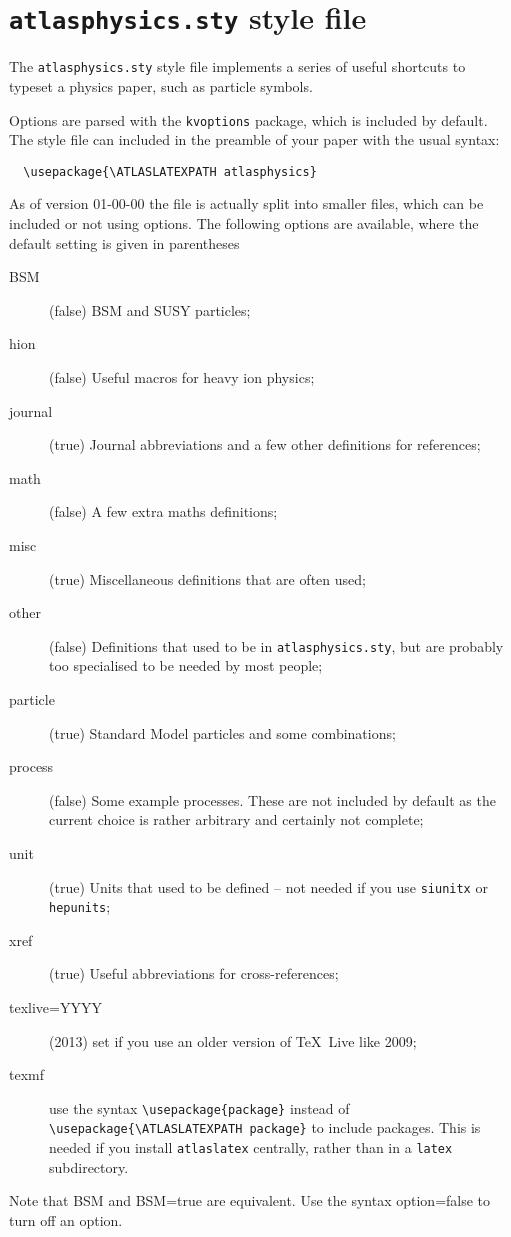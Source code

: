 \documentclass[UKenglish,texlive=2013]{\ATLASLATEXPATH atlasdoc}
\author{Ian C. Brock}
\affil{University of Bonn}
\newcommand{\File}[1]{\texttt{#1}\xspace}
\newcommand{\Macro}[1]{\texttt{\textbackslash #1}\xspace}
\newcommand{\Option}[1]{\textsf{#1}\xspace}
\newcommand{\Package}[1]{\texttt{#1}\xspace}
\begin{document}
\maketitle

\tableofcontents

\section{\File{atlasphysics.sty} style file}
\label{sec:atlasphysics}

The \File{atlasphysics.sty} style file implements a series of useful
shortcuts to typeset a physics paper, such as particle
symbols.

Options are parsed with the \Package{kvoptions} package, which is included by default.
The style file can included in the preamble of your paper with the usual
syntax:
%
\begin{verbatim}
  \usepackage{\ATLASLATEXPATH atlasphysics}
\end{verbatim}
%
As of version 01-00-00 the file is actually split into smaller files,
which can be included or not using options.
The following options are available, where the default setting is given in parentheses
\begin{description}
\item[BSM](false) BSM and SUSY particles;
\item[hion](false) Useful macros for heavy ion physics;
\item[journal](true) Journal abbreviations and a few other definitions for references;
\item[math](false) A few extra maths definitions;
\item[misc](true) Miscellaneous definitions that are often used;
\item[other](false) Definitions that used to be in \File{atlasphysics.sty}, 
  but are probably too specialised to be needed by most people;
\item[particle](true) Standard Model particles and some combinations;
\item[process](false) Some example processes. 
  These are not included by default as the current choice is rather arbitrary
  and certainly not complete;
\item[unit](true) Units that used to be defined -- not needed if you use \Package{siunitx} or \Package{hepunits};
\item[xref](true) Useful abbreviations for cross-references;
\item[texlive=YYYY](2013) set if you use an older version of \TeX\ Live like 2009;
\item[texmf] use the syntax \Macro{usepackage\{package\}}
  instead of \Macro{usepackage\{\textbackslash ATLASLATEXPATH package\}} to include packages.
  This is needed if you install \Package{atlaslatex} centrally,
  rather than in a \File{latex} subdirectory.
\end{description}
Note that \Option{BSM} and \Option{BSM=true} are equivalent.
Use the syntax \Option{option=false} to turn off an option.
\end{document}
